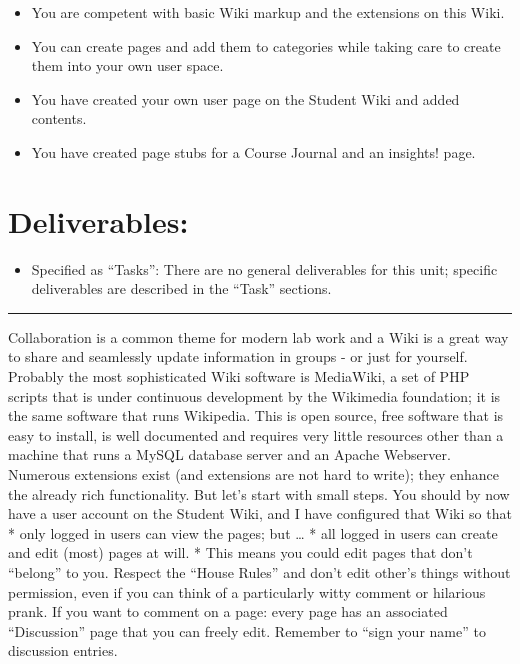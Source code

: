 \documentclass[]{book}
\providecommand{\tightlist}{%
  \setlength{\itemsep}{0pt}\setlength{\parskip}{0pt}}
\begin{document}
\begin{itemize}
\tightlist
\item
  You are competent with basic Wiki markup and the extensions on this
  Wiki.
\item
  You can create pages and add them to categories while taking care to
  create them into your own user space.
\item
  You have created your own user page on the Student Wiki and added
  contents.
\item
  You have created page stubs for a Course Journal and an insights!
  page.
\end{itemize}

\section{Deliverables:}\label{deliverables}

\begin{itemize}
\tightlist
\item
  Specified as ``Tasks'': There are no general deliverables for this
  unit; specific deliverables are described in the ``Task'' sections.
\end{itemize}

\begin{center}\rule{0.5\linewidth}{\linethickness}\end{center}

Collaboration is a common theme for modern lab work and a Wiki is a
great way to share and seamlessly update information in groups - or just
for yourself. Probably the most sophisticated Wiki software is
MediaWiki, a set of PHP scripts that is under continuous development by
the Wikimedia foundation; it is the same software that runs Wikipedia.
This is open source, free software that is easy to install, is well
documented and requires very little resources other than a machine that
runs a MySQL database server and an Apache Webserver. Numerous
extensions exist (and extensions are not hard to write); they enhance
the already rich functionality. But let's start with small steps. You
should by now have a user account on the Student Wiki, and I have
configured that Wiki so that * only logged in users can view the pages;
but \ldots{} * all logged in users can create and edit (most) pages at
will. * This means you could edit pages that don't ``belong'' to you.
Respect the ``House Rules'' and don't edit other's things without
permission, even if you can think of a particularly witty comment or
hilarious prank. If you want to comment on a page: every page has an
associated ``Discussion'' page that you can freely edit. Remember to
``sign your name'' to discussion entries.
\end{document}
